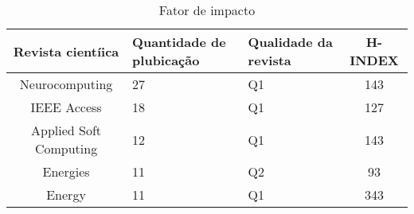 \begin{table}[H]
	\centering
	\caption{Fator de impacto}\label{tb2}
	\begin{tabular}{@{}cp{3cm}p{3cm}c@{}}
		\toprule
		Revista cientíica      & Quantidade de plubicação & Qualidade da revista & H-INDEX \\\midrule
		Neurocomputing         & 27                         & Q1                     & 143     \\
		IEEE Access            & 18                         & Q1                     & 127     \\
		Applied Soft Computing & 12                         & Q1                     & 143     \\
		Energies               & 11                         & Q2                     & 93      \\
		Energy                 & 11                         & Q1                     & 343     \\ \bottomrule
	\end{tabular}
	
	
\end{table}